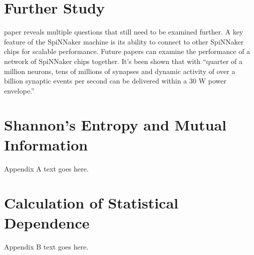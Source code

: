 \documentclass[journal]{./sty/IEEEtran}
\begin{document}
\section{Further Study}
 paper reveals multiple questions that still need to be examined further. 
A key feature of the SpiNNaker machine is its ability to connect to other SpiNNaker chips for scalable performance.
Future papers can examine the performance of a network of SpiNNaker chips together.
It's been shown that with ``quarter of a million neurons, 
tens of millions of synapses and dynamic activity of over a billion synaptic events per second can be delivered within a 30 W power envelope.''




%


\appendices
\section{Shannon's Entropy and Mutual Information}
Appendix A text goes here.

\section{Calculation of Statistical Dependence}
Appendix B text goes here.
\end{document}
